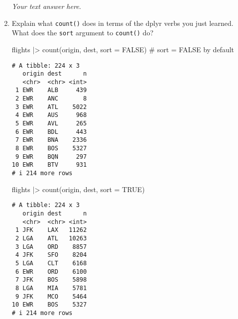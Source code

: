 \documentclass[
  letterpaper,
  DIV=11,
  numbers=noendperiod]{scrreprt}
\newenvironment{Shaded}{\begin{snugshade}}{\end{snugshade}}
\newcommand{\AttributeTok}[1]{\textcolor[rgb]{0.40,0.45,0.13}{#1}}
\newcommand{\CommentTok}[1]{\textcolor[rgb]{0.37,0.37,0.37}{#1}}
\newcommand{\ConstantTok}[1]{\textcolor[rgb]{0.56,0.35,0.01}{#1}}
\newcommand{\FunctionTok}[1]{\textcolor[rgb]{0.28,0.35,0.67}{#1}}
\newcommand{\NormalTok}[1]{\textcolor[rgb]{0.00,0.23,0.31}{#1}}
\newcommand{\SpecialCharTok}[1]{\textcolor[rgb]{0.37,0.37,0.37}{#1}}
\begin{document}
\begin{enumerate}
\begin{tcolorbox}
  \emph{Your text answer here.}

  \end{tcolorbox}
\item
  Explain what \texttt{count()} does in terms of the dplyr verbs you
  just learned. What does the \texttt{sort} argument to \texttt{count()}
  do?

  \begin{tcolorbox}[enhanced jigsaw, left=2mm, rightrule=.15mm, bottomtitle=1mm, opacitybacktitle=0.6, leftrule=.75mm, opacityback=0, colframe=quarto-callout-note-color-frame, bottomrule=.15mm, coltitle=black, toptitle=1mm, colback=white, titlerule=0mm, colbacktitle=quarto-callout-note-color!10!white, title={Answer}, toprule=.15mm, breakable, arc=.35mm]

\begin{Shaded}
\begin{Highlighting}[]
\NormalTok{flights }\SpecialCharTok{|\textgreater{}} 
  \FunctionTok{count}\NormalTok{(origin, dest, }\AttributeTok{sort =} \ConstantTok{FALSE}\NormalTok{) }\CommentTok{\# sort = FALSE by   default}
\end{Highlighting}
\end{Shaded}

\begin{verbatim}
# A tibble: 224 x 3
   origin dest      n
   <chr>  <chr> <int>
 1 EWR    ALB     439
 2 EWR    ANC       8
 3 EWR    ATL    5022
 4 EWR    AUS     968
 5 EWR    AVL     265
 6 EWR    BDL     443
 7 EWR    BNA    2336
 8 EWR    BOS    5327
 9 EWR    BQN     297
10 EWR    BTV     931
# i 214 more rows
\end{verbatim}

\begin{Shaded}
\begin{Highlighting}[]
\NormalTok{flights }\SpecialCharTok{|\textgreater{}} 
  \FunctionTok{count}\NormalTok{(origin, dest, }\AttributeTok{sort =} \ConstantTok{TRUE}\NormalTok{)}
\end{Highlighting}
\end{Shaded}

\begin{verbatim}
# A tibble: 224 x 3
   origin dest      n
   <chr>  <chr> <int>
 1 JFK    LAX   11262
 2 LGA    ATL   10263
 3 LGA    ORD    8857
 4 JFK    SFO    8204
 5 LGA    CLT    6168
 6 EWR    ORD    6100
 7 JFK    BOS    5898
 8 LGA    MIA    5781
 9 JFK    MCO    5464
10 EWR    BOS    5327
# i 214 more rows
\end{verbatim}


\end{tcolorbox}
\end{enumerate}
\end{document}
